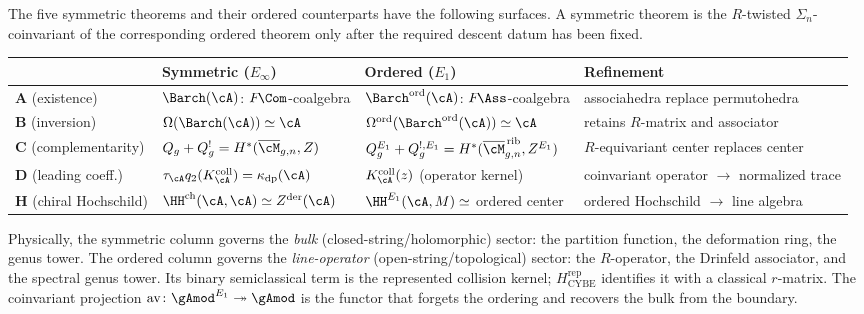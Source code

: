 \begin{remark}
\label{rem:symmetric-ordered-comparison}
The five symmetric theorems and their ordered counterparts have the
following surfaces. A symmetric theorem is the $R$-twisted
$\Sigma_n$-coinvariant of the corresponding ordered theorem only after
the required descent datum has been fixed.

\medskip
\begin{center}
\small
\renewcommand{\arraystretch}{1.35}
\begin{tabular}{@{}l@{\;\;}l@{\;\;}l@{\;\;}l@{}}
\toprule
& \textbf{Symmetric ($E_\infty$)}
& \textbf{Ordered ($E_1$)}
& \textbf{Refinement} \\
\midrule
\textbf{A} (existence)
& $\Barch(\cA)$: $F\!\Com$-coalgebra
& ${\Barch}^{\mathrm{ord}}(\cA)$: $F\!\Ass$-coalgebra
& associahedra replace permutohedra \\
\textbf{B} (inversion)
& $\Omega(\Barch(\cA)) \simeq \cA$
& $\Omega^{\mathrm{ord}}({\Barch}^{\mathrm{ord}}(\cA)) \simeq \cA$
& retains $R$-matrix and associator \\
\textbf{C} (complementarity)
& $Q_g + Q_g^! = H^*(\overline{\cM}_{g,n}, Z)$
& $Q_g^{E_1} + Q_g^{!,E_1}
 = H^*(\overline{\cM}_{g,n}^{\,\mathrm{rib}}, Z^{E_1})$
& $R$-equivariant center replaces center \\
\textbf{D} (leading coeff.)
& $\tau_\cA q_2(K_\cA^{\mathrm{coll}})=\kappa_{\mathrm{dp}}(\cA)$
& $K_\cA^{\mathrm{coll}}(z)$ (operator kernel)
& coinvariant operator $\to$ normalized trace \\
\textbf{H} (chiral Hochschild)
& $\HH^{\mathrm{ch}}(\cA,\cA) \simeq Z^{\mathrm{der}}(\cA)$
& $\HH^{E_1}(\cA, M) \simeq$
 ordered center
& ordered Hochschild $\to$ line algebra \\
\bottomrule
\end{tabular}
\end{center}

\medskip
\noindent
Physically, the symmetric column governs the \emph{bulk}
(closed-string/holomorphic) sector: the partition function, the
deformation ring, the genus tower. The ordered column governs the
\emph{line-operator} (open-string/topological) sector: the
$R$-operator, the Drinfeld associator, and the spectral genus tower.
Its binary semiclassical term is the represented collision kernel;
$H_{\mathrm{CYBE}}^{\mathrm{rep}}$ identifies it with a classical
$r$-matrix.
The coinvariant projection
$\operatorname{av}\colon {\gAmod}^{E_1} \twoheadrightarrow
\gAmod$ is the functor that forgets the ordering and recovers
the bulk from the boundary.
\end{remark}


